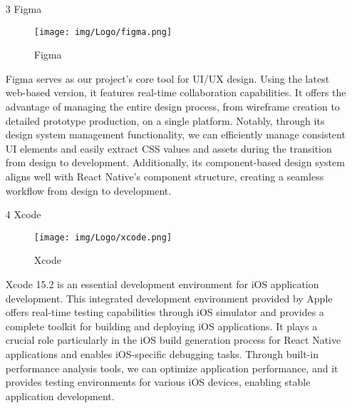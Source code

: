 \documentclass[conference]{IEEEtran}
\begin{document}
\begin{enumerate}
    \vspace{1em}

    \item[3] Figma\par
    \vspace{0.3em}
    \begin{figure}[h]
    \centering
    \texttt{[image: img/Logo/figma.png]}
    \centering
    \caption{Figma} 
    \end{figure}\par
    \vspace{0.3em}
    Figma serves as our project's core tool for UI/UX design. Using the latest web-based version, it features real-time collaboration capabilities. It offers the advantage of managing the entire design process, from wireframe creation to detailed prototype production, on a single platform. Notably, through its design system management functionality, we can efficiently manage consistent UI elements and easily extract CSS values and assets during the transition from design to development. Additionally, its component-based design system aligns well with React Native's component structure, creating a seamless workflow from design to development.

    \vspace{1em}

    \item[4] Xcode\par
    \vspace{0.3em}
    \begin{figure}[h]
    \centering
    \texttt{[image: img/Logo/xcode.png]}
    \centering
    \caption{Xcode} 
    \end{figure}\par
    \vspace{0.3em}
    Xcode 15.2 is an essential development environment for iOS application development. This integrated development environment provided by Apple offers real-time testing capabilities through iOS simulator and provides a complete toolkit for building and deploying iOS applications. It plays a crucial role particularly in the iOS build generation process for React Native applications and enables iOS-specific debugging tasks. Through built-in performance analysis tools, we can optimize application performance, and it provides testing environments for various iOS devices, enabling stable application development.

    \vspace{1em}


\end{enumerate}
\end{document}
